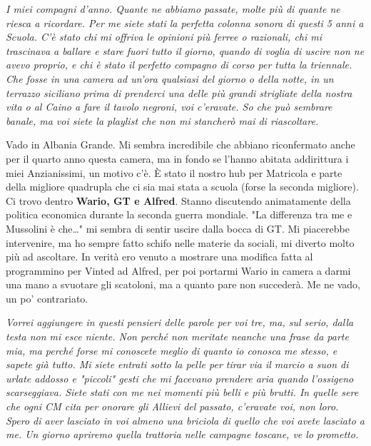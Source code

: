\textit{I miei compagni d'anno. Quante ne abbiamo passate, molte più di quante ne riesca a ricordare. Per me siete stati la perfetta colonna sonora di questi 5 anni a Scuola. C'è stato chi mi offriva le opinioni più ferree o razionali, chi mi trascinava a ballare e stare fuori tutto il giorno, quando di voglia di uscire non ne avevo proprio, e chi è stato il perfetto compagno di corso per tutta la triennale. Che fosse in una camera ad un'ora qualsiasi del giorno o della notte, in un terrazzo siciliano prima di prenderci una delle più grandi strigliate della nostra vita o al Caino a fare il tavolo negroni, voi c'eravate. So che può sembrare banale, ma voi siete la playlist che non mi stancherò mai di riascoltare.}
\vspace{5mm}

Vado in Albania Grande. Mi sembra incredibile che abbiano riconfermato anche per il quarto anno questa camera, ma in fondo se l'hanno abitata addirittura i miei Anzianissimi, un motivo c'è. È stato il nostro hub per Matricola e parte della migliore quadrupla che ci sia mai stata a scuola (forse la seconda migliore). Ci trovo dentro \textbf{Wario, GT e Alfred}. Stanno discutendo animatamente della politica economica durante la seconda guerra mondiale. "La differenza tra me e Mussolini è che\dots" mi sembra di sentir uscire dalla bocca di GT. Mi piacerebbe intervenire, ma ho sempre fatto schifo nelle materie da sociali, mi diverto molto più ad ascoltare. In verità ero venuto a mostrare una modifica fatta al programmino per Vinted ad Alfred, per poi portarmi Wario in camera a darmi una mano a svuotare gli scatoloni, ma a quanto pare non succederà. Me ne vado, un po' contrariato.
\vspace{5mm}

\newpage
\textit{Vorrei aggiungere in questi pensieri delle parole per voi tre, ma, sul serio, dalla testa non mi esce niente. Non perché non meritate neanche una frase da parte mia, ma perché forse mi conoscete meglio di quanto io conosca me stesso, e sapete già tutto. Mi siete entrati sotto la pelle per tirar via il marcio a suon di urlate addosso e "piccoli" gesti che mi facevano prendere aria quando l'ossigeno scarseggiava. Siete stati con me nei momenti più belli e più brutti. In quelle sere che ogni CM cita per onorare gli Allievi del passato, c'eravate voi, non loro. Spero di aver lasciato in voi almeno una briciola di quello che voi avete lasciato a me. Un giorno apriremo quella trattoria nelle campagne toscane, ve lo prometto.}
\vspace{5mm}

